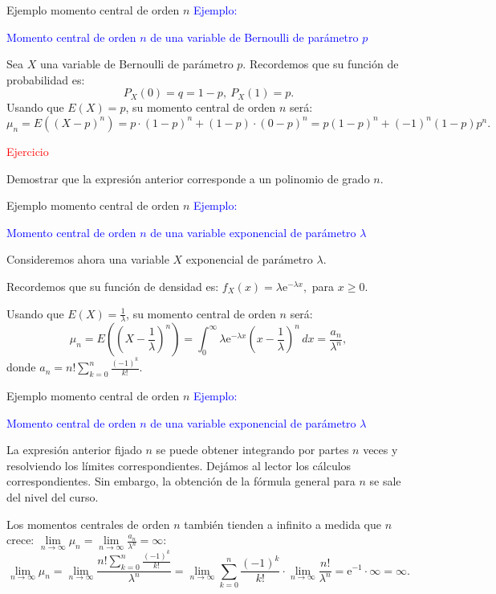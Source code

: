 \documentclass[
  ignorenonframetext,
  aspectratio=169]{beamer}
\newcommand\blue[1]{\textcolor{blue}{#1}}
\newcommand\red[1]{\textcolor{red}{#1}}
\begin{document}
\begin{frame}{Ejemplo momento central de orden \(n\)}
\protect\hypertarget{ejemplo-momento-central-de-orden-n}{}
\blue{Ejemplo:}

\blue{Momento central de orden $n$ de una variable de Bernoulli de parámetro $p$}

Sea \(X\) una variable de Bernoulli de parámetro \(p\). Recordemos que
su función de probabilidad es: \[
P_X(0)=q=1-p,\ P_X(1)=p.
\] Usando que \(E(X)=p\), su momento central de orden \(n\) será: \[
\mu_n = E\left((X-p)^n\right)=p\cdot (1-p)^n+(1-p)\cdot (0-p)^n = p(1-p)^n + (-1)^n (1-p) p^n.
\]

\red{Ejercicio}

Demostrar que la expresión anterior corresponde a un polinomio de grado
\(n\).
\end{frame}

\begin{frame}{Ejemplo momento central de orden \(n\)}
\protect\hypertarget{ejemplo-momento-central-de-orden-n-1}{}
\blue{Ejemplo:}

\blue{Momento central de orden $n$ de una variable exponencial de parámetro $\lambda$}

Consideremos ahora una variable \(X\) exponencial de parámetro
\(\lambda\).

Recordemos que su función de densidad es:
\(f_X(x)=\lambda \mathrm{e}^{-\lambda x},\) para \(x\geq 0\).

Usando que \(E(X)=\frac{1}{\lambda}\), su momento central de orden \(n\)
será: \[
\mu_n = E\left(\left(X-\frac{1}{\lambda}\right)^n\right)=\int_0^\infty \lambda \mathrm{e}^{-\lambda x} \left(x-\frac{1}{\lambda}\right)^n\, dx =\frac{a_n}{\lambda^n},
\] donde \(a_n = n!\sum\limits_{k=0}^n \frac{(-1)^k}{k!}.\)
\end{frame}

\begin{frame}{Ejemplo momento central de orden \(n\)}
\protect\hypertarget{ejemplo-momento-central-de-orden-n-2}{}
\blue{Ejemplo:}

\blue{Momento central de orden $n$ de una variable exponencial de parámetro $\lambda$}

La expresión anterior fijado \(n\) se puede obtener integrando por
partes \(n\) veces y resolviendo los límites correspondientes. Dejámos
al lector los cálculos correspondientes. Sin embargo, la obtención de la
fórmula general para \(n\) se sale del nivel del curso.

Los momentos centrales de orden \(n\) también tienden a infinito a
medida que \(n\) crece:
\(\lim\limits_{n\to\infty}\mu_n = \lim\limits_{n\to\infty}\frac{a_n}{\lambda^n}=\infty\):
\[
\lim_{n\to\infty}\mu_n =\lim_{n\to\infty} \frac{n!\sum\limits_{k=0}^n \frac{(-1)^k}{k!}}{\lambda^n}= 
\lim_{n\to\infty}\sum\limits_{k=0}^n \frac{(-1)^k}{k!}\cdot \lim_{n\to\infty} \frac{n!}{\lambda^n}= \mathrm{e}^{-1}\cdot \infty = \infty.
\]
\end{frame}
\end{document}
